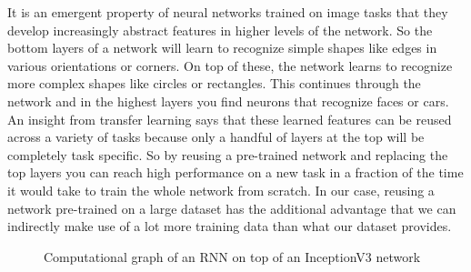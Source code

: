 It is an emergent property of neural networks trained on image tasks that they
develop increasingly abstract features in higher levels of the network. So the
bottom layers of a network will learn to recognize simple shapes like edges in
various orientations or corners. On top of these, the network learns to
recognize more complex shapes like circles or rectangles. This continues through
the network and in the highest layers you find neurons that recognize faces or
cars. An insight from transfer learning says that these learned features can be
reused across a variety of tasks because only a handful of layers at the top
will be completely task specific. So by reusing a pre-trained network and
replacing the top layers you can reach high performance on a new task in a
fraction of the time it would take to train the whole network from scratch. In
our case, reusing a network pre-trained on a large dataset has the additional
advantage that we can indirectly make use of a lot more training data than what
our dataset provides.

\begin{figure}[h]
  \centering
  \caption{Computational graph of an RNN on top of an InceptionV3 network}
  \label{fig:iv3-rnn}
\end{figure}

